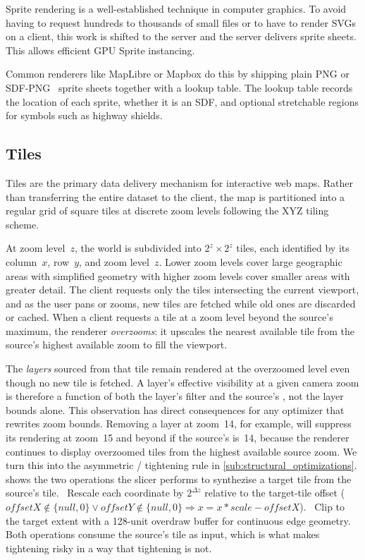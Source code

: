 Sprite rendering is a well-established technique in computer graphics.
To avoid having to request hundreds to thousands of small files or to have to render SVGs on a client, this work is shifted to the server and the server delivers sprite sheets.
This allows efficient \ac{GPU} Sprite instancing.

Common renderers like MapLibre or Mapbox do this by shipping plain \ac{PNG} or \acs{SDF}-\acs{PNG}~\cite{greenImprovedAlphatestedMagnification2007} sprite sheets together with a lookup table.
The lookup table records the location of each sprite, whether it is an SDF, and optional stretchable regions for symbols such as highway shields.

\subsection{Tiles}\label{sec:tiles}

Tiles are the primary data delivery mechanism for interactive web maps.
Rather than transferring the entire dataset to the client, the map is partitioned into a regular grid of square tiles at discrete zoom levels following the XYZ tiling scheme.

At zoom level~$z$, the world is subdivided into $2^z \times 2^z$ tiles, each identified by its column~$x$, row~$y$, and zoom level~$z$.
Lower zoom levels cover large geographic areas with simplified geometry with higher zoom levels cover smaller areas with greater detail.
The client requests only the tiles intersecting the current viewport, and as the user pans or zooms, new tiles are fetched while old ones are discarded or cached.
When a client requests a tile at a zoom level beyond the source's maximum, the renderer \emph{overzooms}: it upscales the nearest available tile from the source's highest available zoom to fill the viewport.

The \emph{layers} sourced from that tile remain rendered at the overzoomed level even though no new tile is fetched.
A layer's effective visibility at a given camera zoom is therefore a function of both the layer's filter and the source's , not the layer bounds alone.
This observation has direct consequences for any optimizer that rewrites zoom bounds.
Removing a layer at zoom~14, for example, will suppress its rendering at zoom~15 and beyond if the source's  is~14, because the renderer continues to display overzoomed tiles from the highest available source zoom.
We turn this into the asymmetric /  tightening rule in \cref{sub:structural_optimizations}.
 shows the two operations the slicer performs to synthezise a target tile from the source's  tile.
~Rescale each coordinate by $2^{\Delta z}$ relative to the target-tile offset ($offsetX \notin \{null,0\} \lor offsetY \notin \{null,0\} \Rightarrow x = x * scale - offsetX$). ~Clip to the target extent with a 128-unit overdraw buffer for continuous edge geometry.
Both operations consume the source's  tile as input, which is what makes  tightening risky in a way that  tightening is not.


